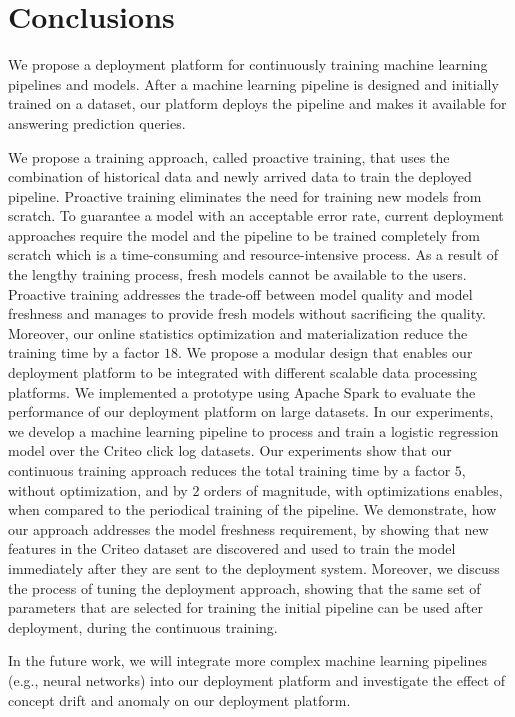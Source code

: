 \section{Conclusions} \label{conclusion}
We propose a deployment platform for continuously training machine learning pipelines and models.
After a machine learning pipeline is designed and initially trained on a dataset, our platform deploys the pipeline and makes it available for answering prediction queries.

We propose a training approach, called proactive training, that uses the combination of historical data and newly arrived data to train the deployed pipeline.
Proactive training eliminates the need for training new models from scratch.
To guarantee a model with an acceptable error rate, current deployment approaches require the model and the pipeline to be trained completely from scratch which is a time-consuming and resource-intensive process.
As a result of the lengthy training process, fresh models cannot be available to the users.
Proactive training addresses the trade-off between model quality and model freshness and manages to provide fresh models without sacrificing the quality. 
Moreover, our online statistics optimization and materialization reduce the training time by a factor $18$.
We propose a modular design that enables our deployment platform to be integrated with different scalable data processing platforms.
We implemented a prototype using Apache Spark to evaluate the performance of our deployment platform on large datasets.
In our experiments, we develop a machine learning pipeline to process and train a logistic regression model over the Criteo click log datasets.
Our experiments show that our continuous training approach reduces the total training time by a factor $5$, without optimization, and by $2$ orders of magnitude, with optimizations enables, when compared to the periodical training of the pipeline.
We demonstrate, how our approach addresses the model freshness requirement, by showing that new features in the Criteo dataset are discovered and used to train the model immediately after they are sent to the deployment system.
Moreover, we discuss the process of tuning the deployment approach, showing that the same set of parameters that are selected for training the initial pipeline can be used after deployment, during the continuous training.

In the future work, we will integrate more complex machine learning pipelines (e.g., neural networks) into our deployment platform and investigate the effect of concept drift and anomaly on our deployment platform.

